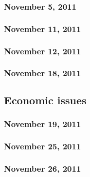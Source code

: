 \documentclass[a4paper]{article}
\begin{document}
\subsubsection{November 5, 2011}


\subsubsection{November 11, 2011}


\subsubsection{November 12, 2011}


\subsubsection{November 18, 2011}


\subsection{Economic issues}



\subsubsection{November 19, 2011}


\subsubsection{November 25, 2011}


\subsubsection{November 26, 2011}
\end{document}
